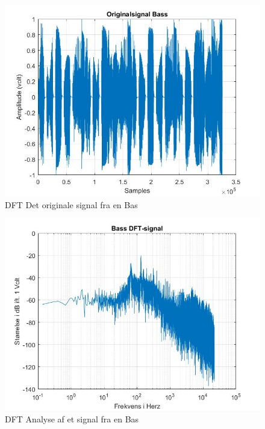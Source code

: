 \begin{figure}[H]
	\centering
	\includegraphics[width=180mm]{figures/Bass/original.jpg}
	\caption{DFT Det originale signal fra en Bas}
	\label{fig:Bas original}
\end{figure}

\begin{figure}[H]
	\centering
	\includegraphics[width=180mm]{figures/Bass/DFT.jpg}
	\caption{DFT Analyse af et signal fra en Bas}
	\label{fig:Bas DFT}
\end{figure}

